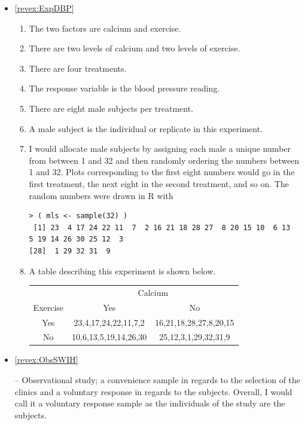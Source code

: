 \documentclass[10pt,openany]{book}\usepackage[]{graphicx}\usepackage[]{color}
\makeatletter
\newenvironment{kframe}{%
 \def\at@end@of@kframe{}%
 \ifinner\ifhmode%
  \def\at@end@of@kframe{\end{minipage}}%
  \begin{minipage}{\columnwidth}%
 \fi\fi%
 \def\FrameCommand##1{\hskip\@totalleftmargin \hskip-\fboxsep
 \colorbox{shadecolor}{##1}\hskip-\fboxsep
     \hskip-\linewidth \hskip-\@totalleftmargin \hskip\columnwidth}%
 \MakeFramed {\advance\hsize-\width
   \@totalleftmargin\z@ \linewidth\hsize
   \@setminipage}}%
 {\par\unskip\endMakeFramed%
 \at@end@of@kframe}
\newenvironment{knitrout}{}{} %
\makeatother
\begin{document}
\begin{itemize}
  \item \hypertarget{ans:ExpDBP}{\ref{revex:ExpDBP}}
    \begin{enumerate}
      \item The two factors are calcium and exercise.
      \item There are two levels of calcium and two levels of exercise.
      \item There are four treatments.
      \item The response variable is the blood pressure reading.
      \item There are eight male subjects per treatment.
      \item A male subject is the individual or replicate in this experiment.
      \item I would allocate male subjects by assigning each male a unique number from between 1 and 32 and then randomly ordering the numbers between 1 and 32.  Plots corresponding to the first eight numbers would go in the first treatment, the next eight in the second treatment, and so on.  The random numbers were drawn in R with
\begin{knitrout}
\color{fgcolor}\begin{kframe}
\begin{verbatim}
> ( mls <- sample(32) )
 [1] 23  4 17 24 22 11  7  2 16 21 18 28 27  8 20 15 10  6 13  5 19 14 26 30 25 12  3
[28]  1 29 32 31  9
\end{verbatim}
\end{kframe}
\end{knitrout}
      \item A table describing this experiment is shown below.

\begin{tabular}{cc|c|}
 & \multicolumn{2}{c}{Calcium} \\
\cline{2-3}
\multicolumn{1}{c|}{Exercise} & Yes & No \\
\hline
\multicolumn{1}{c|}{Yes} & 23,4,17,24,22,11,7,2 & \multicolumn{1}{c|}{16,21,18,28,27,8,20,15} \\
\hline
\multicolumn{1}{c|}{No} & 10,6,13,5,19,14,26,30 &  \multicolumn{1}{c|}{25,12,3,1,29,32,31,9} \\
\cline{2-3}
\end{tabular}
    \end{enumerate}

  \item \hypertarget{ans:ObsSWIH}{\ref{revex:ObsSWIH}} -- Observational study; a convenience sample in regards to the selection of the clinics and a voluntary response in regards to the subjects.  Overall, I would call it a voluntary response sample as the individuals of the study are the subjects.


\end{itemize}
\end{document}
